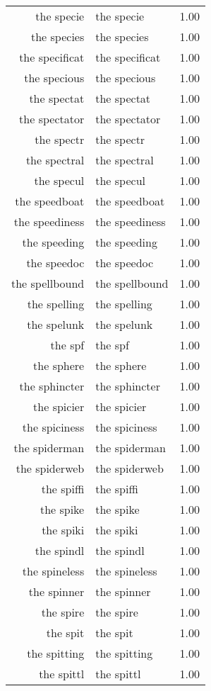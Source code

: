 \begin{table}[ht]
\begin{tabular}{rlr}
  the specie & the specie & 1.00 \\ 
  the species & the species & 1.00 \\ 
  the specificat & the specificat & 1.00 \\ 
  the specious & the specious & 1.00 \\ 
  the spectat & the spectat & 1.00 \\ 
  the spectator & the spectator & 1.00 \\ 
  the spectr & the spectr & 1.00 \\ 
  the spectral & the spectral & 1.00 \\ 
  the specul & the specul & 1.00 \\ 
  the speedboat & the speedboat & 1.00 \\ 
  the speediness & the speediness & 1.00 \\ 
  the speeding & the speeding & 1.00 \\ 
  the speedoc & the speedoc & 1.00 \\ 
  the spellbound & the spellbound & 1.00 \\ 
  the spelling & the spelling & 1.00 \\ 
  the spelunk & the spelunk & 1.00 \\ 
  the spf & the spf & 1.00 \\ 
  the sphere & the sphere & 1.00 \\ 
  the sphincter & the sphincter & 1.00 \\ 
  the spicier & the spicier & 1.00 \\ 
  the spiciness & the spiciness & 1.00 \\ 
  the spiderman & the spiderman & 1.00 \\ 
  the spiderweb & the spiderweb & 1.00 \\ 
  the spiffi & the spiffi & 1.00 \\ 
  the spike & the spike & 1.00 \\ 
  the spiki & the spiki & 1.00 \\ 
  the spindl & the spindl & 1.00 \\ 
  the spineless & the spineless & 1.00 \\ 
  the spinner & the spinner & 1.00 \\ 
  the spire & the spire & 1.00 \\ 
  the spit & the spit & 1.00 \\ 
  the spitting & the spitting & 1.00 \\ 
  the spittl & the spittl & 1.00 \\ 

\end{tabular}
\end{table}

